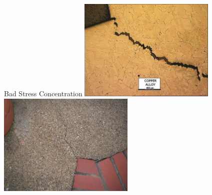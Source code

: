 \documentclass[10pt, svgnames]{beamer}
\begin{document}
\begin{frame}[label={sec:org13f90da}]{Bad Stress Concentration}
\includegraphics[width=0.49\textwidth]{pictures/copper-concentration}
\includegraphics[width=0.49\textwidth]{pictures/concrete-concentration}
\end{frame}
\end{document}
